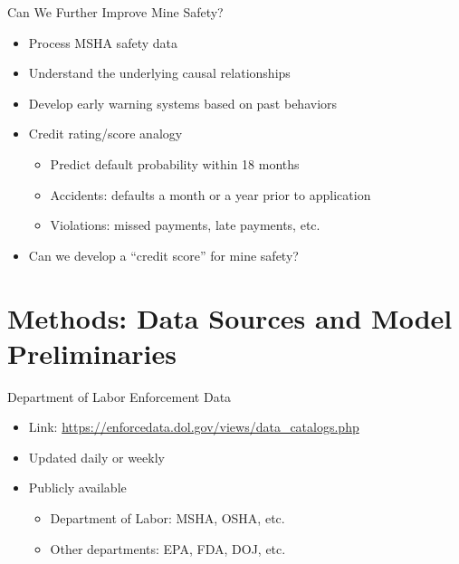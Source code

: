 \documentclass[]{beamer}
\providecommand{\tightlist}{%
  \setlength{\itemsep}{0pt}\setlength{\parskip}{0pt}}
\begin{document}
\begin{frame}{Can We Further Improve Mine Safety?}

\begin{itemize}[<+->]
\tightlist
\item
  Process MSHA safety data
\item
  Understand the underlying causal relationships
\item
  Develop early warning systems based on past behaviors
\item
  Credit rating/score analogy

  \begin{itemize}[<+->]
  \tightlist
  \item
    Predict default probability within 18 months
  \item
    Accidents: defaults a month or a year prior to application
  \item
    Violations: missed payments, late payments, etc.
  \end{itemize}
\item
  Can we develop a ``credit score'' for mine safety?
\end{itemize}

\end{frame}

\section{Methods: Data Sources and Model
Preliminaries}\label{methods-data-sources-and-model-preliminaries}

\begin{frame}{Department of Labor Enforcement Data}

\begin{itemize}[<+->]
\tightlist
\item
  Link: \url{https://enforcedata.dol.gov/views/data_catalogs.php}
\item
  Updated daily or weekly
\item
  Publicly available

  \begin{itemize}[<+->]
  \tightlist
  \item
    Department of Labor: MSHA, OSHA, etc.
  \item
    Other departments: EPA, FDA, DOJ, etc.
  \end{itemize}
\end{itemize}

\end{frame}
\end{document}
